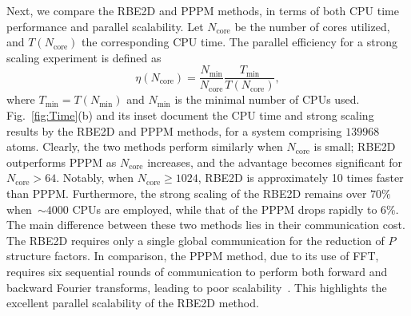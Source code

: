 Next, we compare the RBE2D and PPPM methods, in terms of both
CPU time performance and  {parallel} scalability. %
Let  {$N_{\text{core}}$ be the number of cores utilized}, and $T(N_{\text{core}})$ the corresponding CPU time.  {The parallel efficiency for a strong scaling experiment is defined as}
\begin{equation}\label{eq::etau}
\eta(N_{\text{core}})=\frac{N_{\text{min}}}{N_{\text{core}}}\frac{T_{\text{min}}}{T(N_{\text{core}})},
\end{equation}
where $T_{\text{min}}=T(N_{\text{min}})$ and $N_{\text{min}}$ is the minimal number of CPUs used. 
Fig.~\ref{fig:Time}(b) and its inset document the CPU time and strong scaling results by the RBE2D and PPPM methods, for a system comprising $139968$ atoms. Clearly,
the two methods perform similarly when $N_{\text{core}}$ is small; RBE2D outperforms PPPM as $N_{\text{core}}$ increases, and the advantage becomes significant for $N_{\text{core}}>64$. Notably,
when $N_{\text{core}}\geq 1024$, RBE2D is approximately 10 times faster than PPPM. 
Furthermore, the strong scaling of the RBE2D remains over $70\%$ when~$\sim 4000$ CPUs are employed, while that of the PPPM drops rapidly to $6\%$. 
 {The main difference between these two methods lies in their communication cost. The RBE2D requires only a single global communication for the reduction of $P$ structure factors. In comparison, the PPPM method, due to its use of FFT, requires six sequential rounds of communication to perform both forward and backward Fourier transforms, leading to poor scalability~\cite{fftscalability,arnold2013comparison}.} This highlights the excellent parallel scalability of the RBE2D method. 
